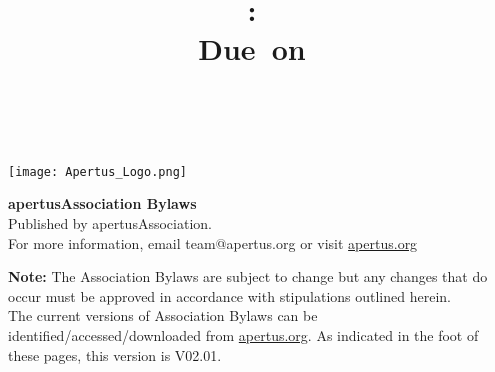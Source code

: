 \documentclass{article}
\title{
\vspace{2in}
\textmd{\textbf{\hmwkClass:\ \hmwkTitle}}\\
\normalsize\vspace{0.1in}\small{Due\ on\ \hmwkDueDate}\\
\vspace{0.1in}\large{\textit{\hmwkClassInstructor\ \hmwkClassTime}}
\vspace{3in}
}
\author{\textbf{\hmwkAuthorName}}
\date{} %
\begin{document}
\begin{titlepage}



\vspace*{50px}
\begin{center}
\texttt{[image: Apertus\_Logo.png]}\\
\end{center}

\vspace*{90px}
\textbf{\hfil apertus\degree Association Bylaws\hfil}\\

\vspace*{\fill}
Published by apertus\degree Association.\\

For more information, email team@apertus.org or visit \href{https://apertus.org}{apertus.org}

\end{titlepage}

\noindent \textbf{Note:} The Association Bylaws are subject to change but any changes that do occur must be approved in accordance with stipulations outlined herein.\\

The current versions of Association Bylaws can be identified/accessed/downloaded from \href{https://www.apertus.org/association-bylaws}{apertus.org}. As indicated in the foot of these pages, this version is V02.01.


\vspace*{40px}
\tableofcontents






\end{document}
